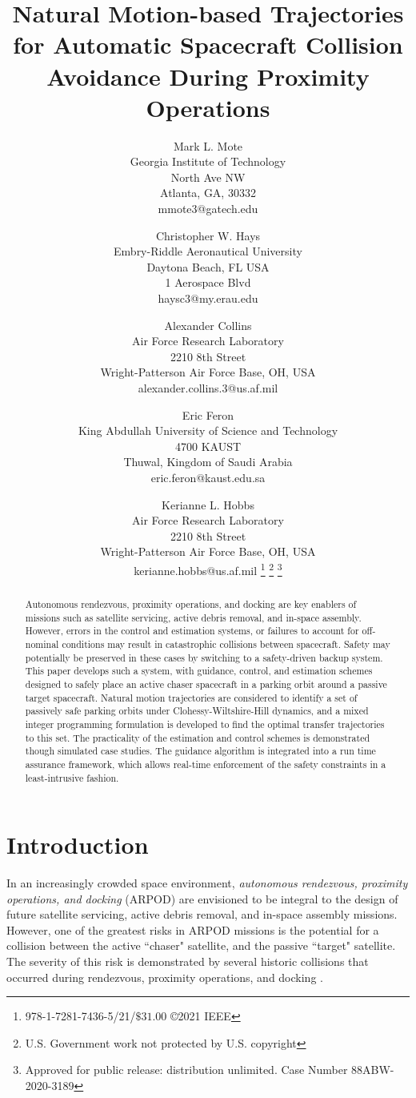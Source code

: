 \documentclass[twocolumn,letterpaper]{IEEEAerospaceCLS}  %
\title{Natural Motion-based Trajectories for Automatic Spacecraft Collision Avoidance During Proximity Operations}
\author{%
Mark L. Mote\\ 
Georgia Institute of Technology\\
North Ave NW\\
Atlanta, GA, 30332\\
mmote3@gatech.edu
\and
Christopher W. Hays\\
Embry-Riddle Aeronautical University\\
Daytona Beach, FL USA \\
1 Aerospace Blvd\\
haysc3@my.erau.edu
\and
Alexander Collins\\
Air Force Research Laboratory \\
2210 8th Street \\
Wright-Patterson Air Force Base, OH, USA \\
alexander.collins.3@us.af.mil
\and
Eric Feron \\
King Abdullah University of Science and Technology\\
4700 KAUST \\
Thuwal, Kingdom of Saudi Arabia \\
eric.feron@kaust.edu.sa 
\and
Kerianne L. Hobbs\\
Air Force Research Laboratory\\
2210 8th Street \\
Wright-Patterson Air Force Base, OH, USA \\
kerianne.hobbs@us.af.mil
\thanks{\footnotesize 978-1-7281-7436-5/21/$\$31.00$ \copyright2021 IEEE}              %
\thanks{{U.S. Government work not protected by U.S. copyright}}         %
\thanks{{Approved for public release: distribution unlimited. Case Number 88ABW-2020-3189}} 
}
\theoremstyle{definition}
\begin{document}
\maketitle

\thispagestyle{plain}
\pagestyle{plain}



\maketitle

\thispagestyle{plain}
\pagestyle{plain}

\begin{abstract}

Autonomous rendezvous, proximity operations, and docking are key enablers of missions such as satellite servicing, active debris removal, and in-space assembly. However, errors in the control and estimation systems, or failures to account for off-nominal conditions may result in catastrophic collisions between spacecraft. 
% 
Safety may potentially be preserved in these cases by switching to a safety-driven backup system. 
This paper develops 
such a system, with 
guidance, control, and estimation schemes designed to safely place an active chaser spacecraft in a parking orbit around a passive target spacecraft. 
%
Natural motion trajectories are considered to identify a set of passively safe parking orbits under Clohessy-Wiltshire-Hill dynamics, and a mixed integer programming formulation is developed to find the optimal transfer trajectories to this set. 
The practicality of the estimation and control schemes is demonstrated though simulated case studies. 
The guidance algorithm is integrated into a run time assurance framework, which allows real-time enforcement of the safety constraints in a least-intrusive fashion. 


\end{abstract}
\tableofcontents





\section{Introduction}
In an increasingly crowded space environment, \textit{autonomous rendezvous, proximity operations, and docking} (ARPOD) are envisioned to be integral to the design of future satellite servicing, active debris removal, and in-space assembly missions. However,
one of the greatest risks in ARPOD missions is 
the potential for a collision between the active ``chaser" satellite, and the passive ``target" satellite. The severity of this risk is demonstrated by several historic collisions that occurred during rendezvous, proximity operations, and docking \cite{evans2014dawn,holland20026,oberg1998shuttle,Thomas2007Selected}.
\end{document}
